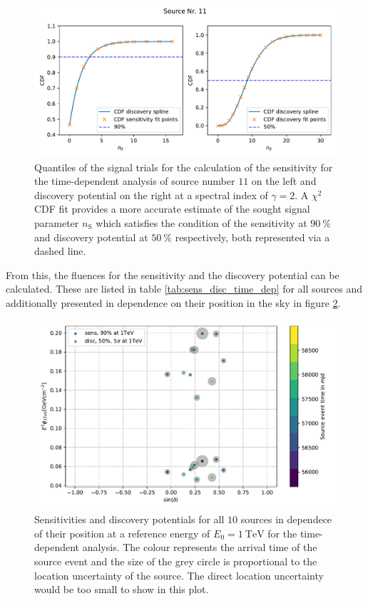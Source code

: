 \begin{figure}
    \centering
    \includegraphics[width=\linewidth]{Plots/05_csky/9_years_gfu_gold_time_dep_cdf_1.pdf}
    \caption{Quantiles of the signal trials for the calculation of the sensitivity for the time-dependent analysis of source number $\num{11}$ on the left and discovery potential on the right at a spectral index of $\gamma=\num{2}$. A $\chi^2$ CDF fit provides a more accurate estimate of the sought signal parameter $n_\text{S}$ which satisfies the condition of the sensitivity at $\SI{90}{\percent}$ and discovery potential at $\SI{50}{\percent}$ respectively, both represented via a dashed line.}
    \label{fig:time_dep_cdf_sens_disc_1}
\end{figure}
From this, the fluences for the sensitivity and the discovery potential can be calculated. These are listed in table \ref{tab:sens_disc_time_dep} for all sources and additionally presented in dependence on their position in the sky in figure \ref{fig:sens_disc_time_dep}.
\begin{figure}
    \centering
    \includegraphics[width=\linewidth]{Plots/05_csky/time_dep_sens_disc_dec_time.pdf}
    \caption{Sensitivities and discovery potentials for all $\num{10}$ sources in dependece of their position at a reference energy of $E_0 = \SI{1}{\tera\electronvolt}$ for the time-dependent analysis. The colour represents the arrival time of the source event and the size of the grey circle is proportional to the location uncertainty of the source. The direct location uncertainty would be too small to show in this plot.}
    \label{fig:sens_disc_time_dep}
\end{figure}
